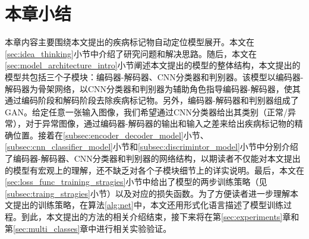 \section{本章小结}\label{sec:chapter3_summary}
本章内容主要围绕本文提出的疾病标记物自动定位模型展开。本文在\ref{sec:idea_thinking}小节中介绍了研究问题和解决思路。随后，本文在\ref{sec:model_architecture_intro}小节阐述本文提出的模型的整体结构，本文提出的模型共包括三个子模块：编码器-解码器、CNN分类器和判别器。该模型以编码器-解码器为骨架网络，以CNN分类器和判别器为辅助角色指导编码器-解码器，使其通过编码阶段和解码阶段去除疾病标记物。另外，编码器-解码器和判别器组成了GAN。给定任意一张输入图像，我们希望通过CNN分类器给出其类别（正常/异常），对于异常图像，通过编码器-解码器的输出和输入之差来给出疾病标记物的精确位置。接着在\ref{subsec:encoder_decoder_model}小节、\ref{subsec:cnn_classifier_model}小节和\ref{subsec:discrimintor_model}小节中分别介绍了编码器-解码器、CNN分类器和判别器的网络结构，以期读者不仅能对本文提出的模型有宏观上的理解，还不缺乏对各个子模块细节上的详实说明。最后，本文在\ref{sec:loss_func_training_stragies}小节中给出了模型的两步训练策略（见\ref{subsec:traing_stragies}小节）以及对应的损失函数。为了方便读者进一步理解本文提出的训练策略，在算法\ref{alg:net}中，本文还用形式化语言描述了模型训练过程。到此，本文提出的方法的相关介绍结束，接下来将在第\ref{sec:experiments}章和第\ref{sec:multi_classes}章中进行相关实验验证。

